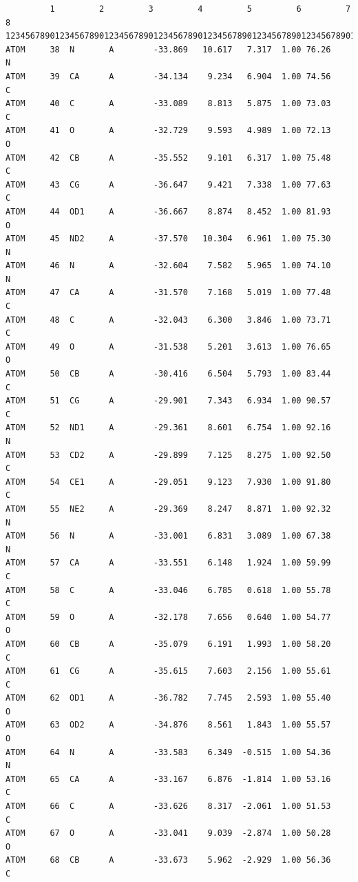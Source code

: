 \documentclass[
  letterpaper,
  DIV=11,
  numbers=noendperiod]{scrreprt}
\begin{document}
\begin{verbatim}
         1         2         3         4         5         6         7         8
12345678901234567890123456789012345678901234567890123456789012345678901234567890
ATOM     38  N       A        -33.869   10.617   7.317  1.00 76.26           N
ATOM     39  CA      A        -34.134    9.234   6.904  1.00 74.56           C
ATOM     40  C       A        -33.089    8.813   5.875  1.00 73.03           C
ATOM     41  O       A        -32.729    9.593   4.989  1.00 72.13           O
ATOM     42  CB      A        -35.552    9.101   6.317  1.00 75.48           C
ATOM     43  CG      A        -36.647    9.421   7.338  1.00 77.63           C
ATOM     44  OD1     A        -36.667    8.874   8.452  1.00 81.93           O
ATOM     45  ND2     A        -37.570   10.304   6.961  1.00 75.30           N
ATOM     46  N       A        -32.604    7.582   5.965  1.00 74.10           N
ATOM     47  CA      A        -31.570    7.168   5.019  1.00 77.48           C
ATOM     48  C       A        -32.043    6.300   3.846  1.00 73.71           C
ATOM     49  O       A        -31.538    5.201   3.613  1.00 76.65           O
ATOM     50  CB      A        -30.416    6.504   5.793  1.00 83.44           C
ATOM     51  CG      A        -29.901    7.343   6.934  1.00 90.57           C
ATOM     52  ND1     A        -29.361    8.601   6.754  1.00 92.16           N
ATOM     53  CD2     A        -29.899    7.125   8.275  1.00 92.50           C
ATOM     54  CE1     A        -29.051    9.123   7.930  1.00 91.80           C
ATOM     55  NE2     A        -29.369    8.247   8.871  1.00 92.32           N
ATOM     56  N       A        -33.001    6.831   3.089  1.00 67.38           N
ATOM     57  CA      A        -33.551    6.148   1.924  1.00 59.99           C
ATOM     58  C       A        -33.046    6.785   0.618  1.00 55.78           C
ATOM     59  O       A        -32.178    7.656   0.640  1.00 54.77           O
ATOM     60  CB      A        -35.079    6.191   1.993  1.00 58.20           C
ATOM     61  CG      A        -35.615    7.603   2.156  1.00 55.61           C
ATOM     62  OD1     A        -36.782    7.745   2.593  1.00 55.40           O
ATOM     63  OD2     A        -34.876    8.561   1.843  1.00 55.57           O
ATOM     64  N       A        -33.583    6.349  -0.515  1.00 54.36           N
ATOM     65  CA      A        -33.167    6.876  -1.814  1.00 53.16           C
ATOM     66  C       A        -33.626    8.317  -2.061  1.00 51.53           C
ATOM     67  O       A        -33.041    9.039  -2.874  1.00 50.28           O
ATOM     68  CB      A        -33.673    5.962  -2.929  1.00 56.36           C

\end{verbatim}
\end{document}

